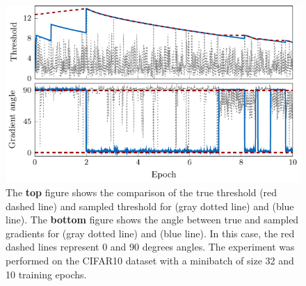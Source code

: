 \begin{figure}
  \centering
  \includegraphics{images/deep_thresholds.pdf}
  \caption{The \textbf{top} figure shows the comparison of the true threshold (red dashed line) and sampled threshold for \TopPush (gray dotted line) and \DeepTopPush (blue line). The \textbf{bottom} figure shows the angle between true and sampled gradients for \TopPush (gray dotted line) and \DeepTopPush (blue line). In this case, the red dashed lines represent 0 and 90 degrees angles. The experiment was performed on the CIFAR10 dataset with a minibatch of size 32 and 10 training epochs.}
  \label{fig:thresholds2}
\end{figure}
